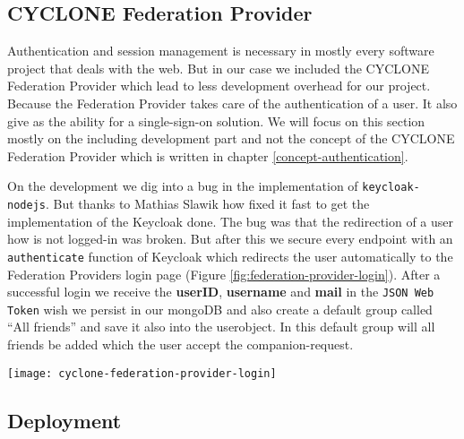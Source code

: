 \subsection{CYCLONE Federation Provider}
\label{federation-provider}

Authentication and session management is necessary in mostly every software project that deals with the web. But in our case we included the CYCLONE Federation Provider which lead to less development overhead for our project. Because the Federation Provider takes care of the authentication of a user. It also give as the ability for a single-sign-on solution. We will focus on this section mostly on the including development part and not the concept of the CYCLONE Federation Provider which is written in chapter \ref{concept-authentication}.

On the development we dig into a bug in the implementation of \texttt{keycloak-nodejs}. But thanks to Mathias Slawik how fixed it fast to get the implementation of the Keycloak done. The bug was that the redirection of a user how is not logged-in was broken. But after this we secure every endpoint with an \texttt{authenticate} function of Keycloak which redirects the user automatically to the Federation Providers login page (Figure \ref{fig:federation-provider-login}). After a successful login we receive the \textbf{userID}, \textbf{username} and \textbf{mail} in the \texttt{JSON Web Token} wish we persist in our mongoDB and also create a default group called \enquote{All friends} and save it also into the userobject. In this default group will all friends be added which the user accept the companion-request.

\begin{center}
    \texttt{[image: cyclone-federation-provider-login]}\\
    \label{fig:federation-provider-login}
\end{center}

\subsection{Deployment}

